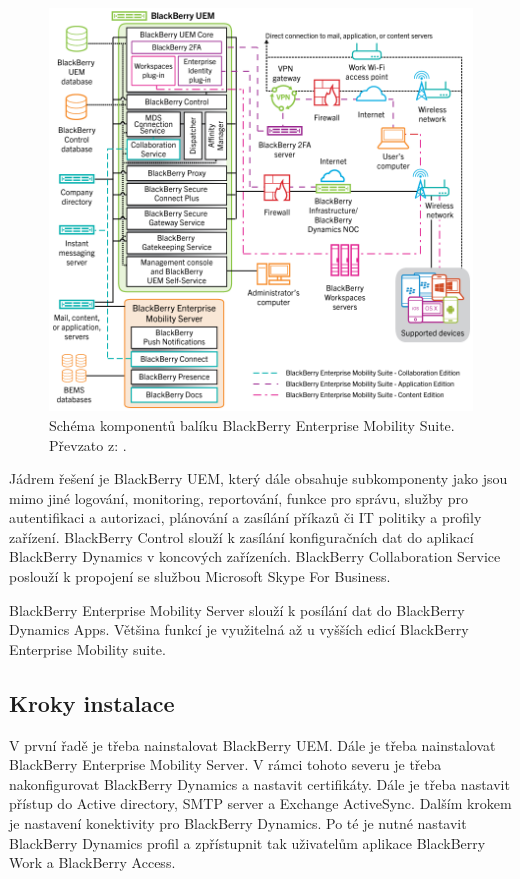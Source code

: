 \begin{figure}[h!]
\centering
\includegraphics[width=13cm]{img/BBEMS}
\caption{Schéma komponentů balíku BlackBerry Enterprise Mobility Suite. Převzato z: \cite{BBUEM}.}\label{BBEMS}
\end{figure}

Jádrem řešení je BlackBerry UEM, který dále obsahuje subkomponenty jako jsou mimo jiné logování, monitoring, reportování, funkce pro správu, služby pro autentifikaci a autorizaci, plánování a zasílání příkazů či IT politiky a profily zařízení. BlackBerry Control slouží k zasílání konfiguračních dat do aplikací BlackBerry Dynamics v koncových zařízeních. BlackBerry Collaboration Service poslouží k propojení se službou Microsoft Skype For Business. 

BlackBerry Enterprise Mobility Server slouží k posílání dat do BlackBerry Dynamics Apps. Většina funkcí je využitelná až u vyšších edicí BlackBerry Enterprise Mobility suite.

\subsection{Kroky instalace}
V první řadě je třeba nainstalovat BlackBerry UEM. Dále je třeba nainstalovat BlackBerry Enterprise Mobility Server. V rámci tohoto severu je třeba nakonfigurovat BlackBerry Dynamics a nastavit certifikáty.  Dále je třeba nastavit přístup do Active directory, SMTP server a Exchange ActiveSync. Dalším krokem je nastavení konektivity pro BlackBerry Dynamics. Po té je nutné nastavit BlackBerry Dynamics profil a zpřístupnit tak uživatelům aplikace BlackBerry Work a BlackBerry Access. 

